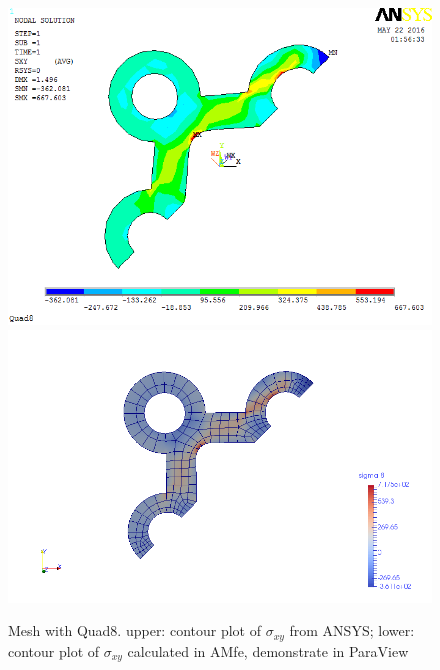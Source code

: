 \begin{figure}[htbp]
	\begin{center}
		\includegraphics[width=13cm,clip]{Quad8_Sxy.png} 		
		\includegraphics[width=13cm,clip]{Quad8_Sxy_P.png} 		
		\caption{Mesh with Quad8. upper: contour plot of $\sigma_{xy}$ from ANSYS; lower: contour plot of $\sigma_{xy}$ calculated in AMfe, demonstrate in ParaView} \label{fig: Quad8_Sxy}
	\end{center}
\end{figure}
\clearpage 

